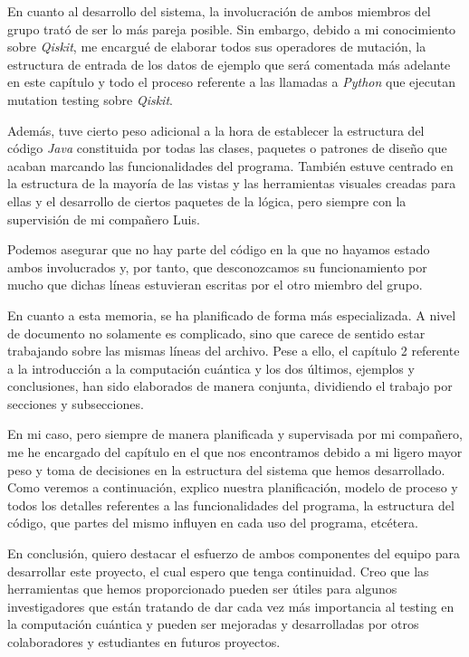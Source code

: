 En cuanto al desarrollo del sistema, la involucración de ambos miembros del grupo trató de ser lo más pareja posible. Sin embargo, debido a mi conocimiento sobre \textit{Qiskit}, me encargué de elaborar todos sus operadores de mutación, la estructura de entrada de los datos de ejemplo que será comentada más adelante en este capítulo y todo el proceso referente a las llamadas a \textit{Python} que ejecutan mutation testing sobre \textit{Qiskit}.

Además, tuve cierto peso adicional a la hora de establecer la estructura del código \textit{Java}  constituida por todas las clases, paquetes o patrones de diseño que acaban marcando las funcionalidades del programa. También estuve centrado en la estructura de la mayoría de las vistas y las herramientas visuales creadas para ellas y el desarrollo de ciertos paquetes de la lógica, pero siempre con la supervisión de mi compañero Luis.

Podemos asegurar que no hay parte del código en la que no hayamos estado ambos involucrados y, por tanto, que desconozcamos su funcionamiento por mucho que dichas líneas estuvieran escritas por el otro miembro del grupo.

En cuanto a esta memoria, se ha planificado de forma más especializada. A nivel de documento no solamente es complicado, sino que carece de sentido estar trabajando sobre las mismas líneas del archivo. Pese a ello, el capítulo 2 referente a la introducción a la computación cuántica y los dos últimos, ejemplos y conclusiones, han sido elaborados de manera conjunta, dividiendo el trabajo por secciones y subsecciones.

En mi caso, pero siempre de manera planificada y supervisada por mi compañero, me he encargado del capítulo en el que nos encontramos debido a mi ligero mayor peso y toma de decisiones en la estructura del sistema que hemos desarrollado. Como veremos a continuación, explico nuestra planificación, modelo de proceso y todos los detalles referentes a las funcionalidades del programa, la estructura del código, que partes del mismo influyen en cada uso del programa, etcétera.

En conclusión, quiero destacar el esfuerzo de ambos componentes del equipo para desarrollar este proyecto, el cual espero que tenga continuidad. Creo que las herramientas que hemos proporcionado pueden ser útiles para algunos investigadores que están tratando de dar cada vez más importancia al testing en la computación cuántica y pueden ser mejoradas y desarrolladas por otros colaboradores y estudiantes en futuros proyectos.

